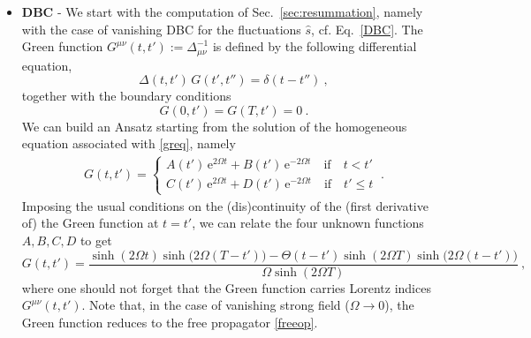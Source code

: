 \documentclass[12pt,a4paper]{article}
\numberwithin{equation}{section}
\numberwithin{equation}{section}
\begin{document}
\begin{itemize}
 \item \textbf{DBC} - We start with the computation of Sec.~\ref{sec:resummation}, namely with the case of vanishing DBC for the fluctuations $\hat{s}$, cf. Eq.~\eqref{DBC}. The Green function $G^{\mu\nu}(t,t'):=\Delta^{-1}_{\mu\nu}$ is defined by the following differential equation,
\begin{equation} \label{greq}
\Delta(t,t') \, G(t',t'')=\delta(t-t'')\ ,
\end{equation}
together with the boundary conditions
\begin{equation}
G (0,t')=G (T,t')=0\ .
\end{equation}
We can build an Ansatz starting from the solution of the homogeneous equation associated with \eqref{greq}, namely
\begin{align}
G (t,t')=\begin{cases}
 A(t') \, \mathrm{e}^{2\Omega t}+B(t') \, \mathrm{e}^{-2\Omega t} \quad \text{if} \quad t < t' \\
C(t') \, \mathrm{e}^{2\Omega t}+D(t') \, \mathrm{e}^{-2\Omega t} \quad \text{if} \quad t' \leq t
\end{cases}\ .
\end{align}
Imposing the usual conditions on the (dis)continuity of the (first derivative of) the Green function at $t=t'$, we can relate the four unknown functions $A,B,C,D$ to get
\begin{equation}
G(t,t')=\frac{ \sinh(2\Omega t) \sinh\big(2\Omega (T-t')\big) - \Theta(t-t') \sinh(2\Omega T) \sinh\big(2\Omega (t-t')\big) }{\Omega \sinh(2\Omega T)}\ ,
\end{equation}
where one should not forget that the Green function carries Lorentz indices $G^{\mu\nu}(t,t')$. 
Note that, in the case of vanishing strong field ($\Omega \to 0$), the Green function reduces to the free propagator \eqref{freeop}.


\end{itemize}
\end{document}
